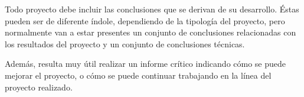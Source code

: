 {\label{ch:conclusiones}}

Todo proyecto debe incluir las conclusiones que se derivan de su desarrollo.
Éstas pueden ser de diferente índole, dependiendo de la tipología del proyecto,
pero normalmente van a estar presentes un conjunto de conclusiones relacionadas
con los resultados del proyecto y un conjunto de conclusiones técnicas. 

Además, resulta muy útil realizar un informe crítico indicando cómo se puede
mejorar el proyecto, o cómo se puede continuar trabajando en la línea del
proyecto realizado. 
